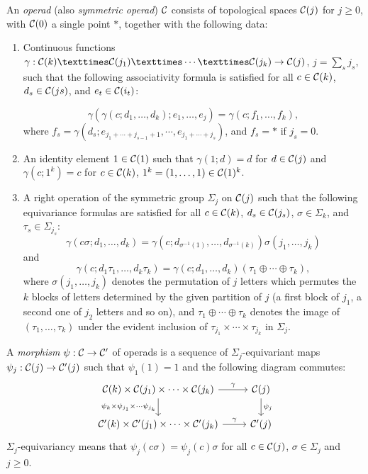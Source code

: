 \documentclass[TFM.tex]{subfiles}
\begin{document}
\begin{defi}\label{operadtop}
An \emph{operad} (also \emph{symmetric operad}) $\mathcal{C}$ consists of topological spaces $\mathcal{C}(j)$ for $j\geq 0$, with $\mathcal{C}(0)$ a single point $*$, together with the following data:
\begin{enumerate}[(1)]
\item Continuous functions $\gamma : \CC(k) × \CC(j_1) × \cdots × \CC(j_k) \to \CC(j)$, $j =\sum_s j_s$, such that the
following associativity formula is satisfied for all $c\in \mathcal{C}(k)$, $d_s \in \mathcal{C}(js)$, and $e_t \in \mathcal{C}(i_t)$:

\[\gamma(
\gamma(c; d_1, \dots , d_k); e_1, \dots , e_j) = 
\gamma(c; f_1, \dots , f_k),
\]
where $f_s = \gamma(d_s; e_{j_1+\cdots+j_{s−1}+1}, \cdots , e_{j_1+\cdots+j_s} )$, and $f_s = *$ if $j_s = 0$.

\item An identity element $1 \in \mathcal{C}(1)$ such that 
$\gamma(1; d) = d$ for $d \in \mathcal{C}(j)$ and 
$\gamma(c; 1^k) = c$ for
$c \in \mathcal{C}(k)$, $1^k = (1, \dots , 1) \in \mathcal{C}(1)^k$.

\item A right operation of the symmetric group $\Sigma_j$ on $\mathcal{C}(j)$ such that the following equivariance
formulas are satisfied for all $c\in \mathcal{C}(k)$, $d_s \in \mathcal{C}(j_s)$, $\sigma\in\Sigma_k$, and $\tau_s\in\Sigma_{j_s}$:
\[
\gamma(c\sigma; d_1, \dots , d_k) = 
\gamma(c; d_{\sigma^{−1}(1)}, \dots , d_{\sigma^{−1}(k)})\sigma(j_1, \dots , j_k)
\]
and 
\[
\gamma(c; d_1\tau_1, \dots , d_k\tau_k) = \gamma(c; d_1, \dots , d_k)(\tau_1\oplus\cdots\oplus\tau_k),
\] 
where $\sigma(j_1, \dots , j_k)$ denotes the
permutation of $j$ letters which permutes the $k$ blocks of letters determined by the given
partition of $j$ (a first block of $j_1$, a second one of $j_2$ letters and so on), and $\tau_1\oplus\cdots\oplus\tau_k$ denotes the image of $(\tau_1, \dots , \tau_k)$ under the evident inclusion of $\tau_{j_1} × \cdots × \tau_{j_k}$ in $\Sigma_j$.
\end{enumerate}
\end{defi}



\begin{defi}
A \emph{morphism} $\psi:\mathcal{C} \to \mathcal{C}'$ of operads is a sequence of $\Sigma_j$-equivariant maps  $\psi_j : \mathcal{C}(j)\to \mathcal{C}'(j)$ such that
 $\psi_1(1) = 1$ and the following diagram commutes:
 \[
 \begin{tikzcd}
\CC(k)\times \CC(j_1)\times\cdots\times \CC(j_k) \arrow[r, "\gamma"] \arrow[d, "\psi_k\times\psi_{j_1}\times\cdots\psi_{j_k}"'] & \CC(j) \arrow[d, "\psi_j"] \\
\CC'(k)\times \CC'(j_1)\times\cdots\times \CC'(j_k) \arrow[r, "\gamma"]                                                         & \CC'(j)                   
\end{tikzcd}\]
$\Sigma_j$-equivariancy means that $\psi_j(c\sigma)=\psi_j(c)\sigma$ for all $c\in \mathcal{C}(j)$, $\sigma\in\Sigma_j$ and $j\geq 0$. 
\end{defi}
\end{document}
